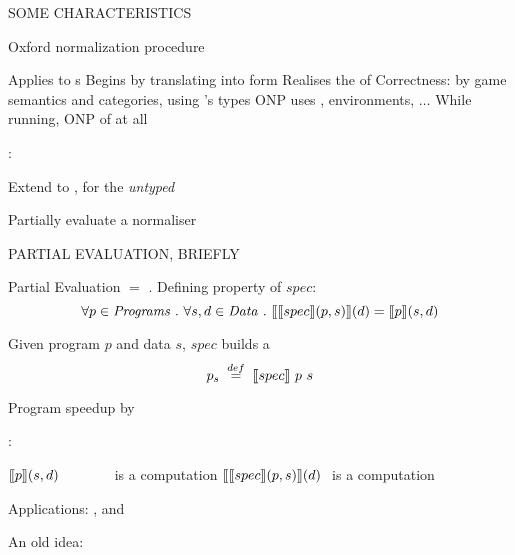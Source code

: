 \documentclass[12pt,fleqn,landscape]{article}
\begin{document}
\begin{slide}{SOME  CHARACTERISTICS}

Oxford normalization procedure

\bi
\ii Applies to  {\lexp}s
\ii Begins by translating  into  form
\ii Realises the  of 
\ii Correctness: by game semantics and categories, using 's types
\ii ONP uses , environments, $\dots$
\ii While running, ONP  of  
  at all
\ei
\vair\vair

:
\bi
\vair

\ii Extend  to , for the \textit{untyped} \lc
\vair

\ii Partially evaluate a normaliser
\ei

\end{slide}


\begin{slide}{PARTIAL EVALUATION, BRIEFLY}

Partial Evaluation $=$ . Defining property of
  $spec$:
  $$
  \forall p\in \mathit{Programs}\ .\ \forall s, d \in \mathit{Data}\ . \ 
  \lsem \lsem spec\rsem (p, s)\rsem (d) = \lsem p\rsem (s, d)
  $$

\bi
\ii Given program $p$ and  data $s$, $spec$ builds a 
  \blue{residual program}
  $$p_s\;\stackrel{def}{=}\;\mbox{$\lbrack\hspace{-0.3ex}\lbrack$} spec \mbox{$\rbrack\hspace{-0.3ex}\rbrack$} \ p\ s$$

\ii Program speedup by 
\vair

\ii {}:
\vair

  \bi
  \ii $\mbox{$\lbrack\hspace{-0.3ex}\lbrack$} p \mbox{$\rbrack\hspace{-0.3ex}\rbrack$} (s, d)\;\;\;\;\;\;\;\;\;\;\;\;\;$ is a  
    computation
  \ii $\mbox{$\lbrack\hspace{-0.3ex}\lbrack$} \mbox{$\lbrack\hspace{-0.3ex}\lbrack$} spec \mbox{$\rbrack\hspace{-0.3ex}\rbrack$} (p, s) \mbox{$\rbrack\hspace{-0.3ex}\rbrack$} (d)\ $ is a  
    computation
  \ei
\vair

\ii Applications: , and 
\vair

\ii An old idea: 

\ei

\end{slide}
\end{document}
